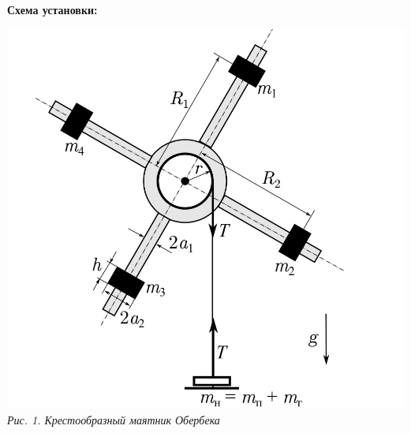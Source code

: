 \begin{center}
    \Large{\bf Схема установки:}
\end{center}

\begin{center}
    \includegraphics[scale=0.6]{picks/scheme_1.png} \\
    \textit{\textcolor[HTML]{000000}{Рис. 1. Крестообразный маятник Обербека}}
\end{center}